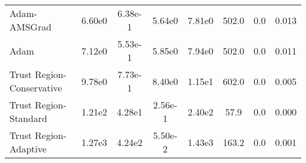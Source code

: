 \documentclass{article}
\begin{document}
\begin{table}[htbp]
{\begin{tabular}{l*{7}{S[table-format=2.2e-1]}}
Adam-AMSGrad & 6.60e0 & 6.38e-1 & 5.64e0 & 7.81e0 & 502.0 & 0.0 & 0.013 \\
Adam & 7.12e0 & 5.53e-1 & 5.85e0 & 7.94e0 & 502.0 & 0.0 & 0.011 \\
Trust Region-Conservative & 9.78e0 & 7.73e-1 & 8.40e0 & 1.15e1 & 602.0 & 0.0 & 0.005 \\
Trust Region-Standard & 1.21e2 & 4.28e1 & 2.56e-1 & 2.40e2 & 57.9 & 0.0 & 0.000 \\
Trust Region-Adaptive & 1.27e3 & 4.24e2 & 5.50e-2 & 1.43e3 & 163.2 & 0.0 & 0.001 \\
\bottomrule
\end{tabular}
}
\end{table}
\end{document}
